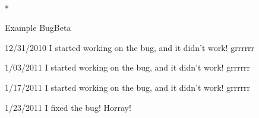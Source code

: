 \documentclass[12pt,letterpaper,onecolumn]{article}
\begin{document}
\\*
 
\begin{bugentry}{Example Bug}{Beta}
\begin{bugupdate}{1}{12/31/2010}
I started working on the bug, and it didn't work! grrrrrr
\end{bugupdate}

\begin{bugupdate}{2}{1/03/2011}
I started working on the bug, and it didn't work! grrrrrr
\end{bugupdate}

\begin{bugupdate}{3}{1/17/2011}
I started working on the bug, and it didn't work! grrrrrr
\end{bugupdate}

\begin{bugupdate}{4}{1/23/2011}
I fixed the bug! Horray!
\end{bugupdate}

\end{bugentry}
\end{document}
